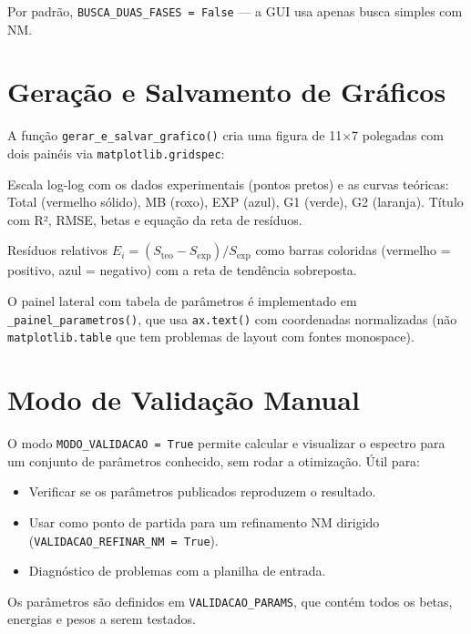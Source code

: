\documentclass[12pt,a4paper]{report}
\newcommand{\code}[1]{\texttt{#1}}
\begin{document}
Por padrão, \code{BUSCA\_DUAS\_FASES = False} — a GUI usa apenas busca
simples com NM.

\section{Geração e Salvamento de Gráficos}

A função \code{gerar\_e\_salvar\_grafico()} cria uma figura de 11$\times$7
polegadas com dois painéis via \code{matplotlib.gridspec}:

\begin{description}[leftmargin=2.5em, style=nextline]
  \item[\textbf{Painel superior (razão 3:1)}]
    Escala log-log com os dados experimentais (pontos pretos) e as curvas
    teóricas: Total (vermelho sólido), MB (roxo), EXP (azul), G1 (verde),
    G2 (laranja). Título com R², RMSE, betas e equação da reta de resíduos.

  \item[\textbf{Painel inferior}]
    Resíduos relativos $E_i = (S_{\text{teo}} - S_{\text{exp}})/S_{\text{exp}}$
    como barras coloridas (vermelho = positivo, azul = negativo) com a reta
    de tendência sobreposta.
\end{description}

O painel lateral com tabela de parâmetros é implementado em \code{\_painel\_parametros()},
que usa \texttt{ax.text()} com coordenadas normalizadas (não \texttt{matplotlib.table}
que tem problemas de layout com fontes monospace).

\section{Modo de Validação Manual}

O modo \code{MODO\_VALIDACAO = True} permite calcular e visualizar o espectro
para um conjunto de parâmetros conhecido, sem rodar a otimização. Útil para:
\begin{itemize}
  \item Verificar se os parâmetros publicados reproduzem o resultado.
  \item Usar como ponto de partida para um refinamento NM dirigido
    (\code{VALIDACAO\_REFINAR\_NM = True}).
  \item Diagnóstico de problemas com a planilha de entrada.
\end{itemize}

Os parâmetros são definidos em \code{VALIDACAO\_PARAMS}, que contém todos
os betas, energias e pesos a serem testados.
\end{document}

